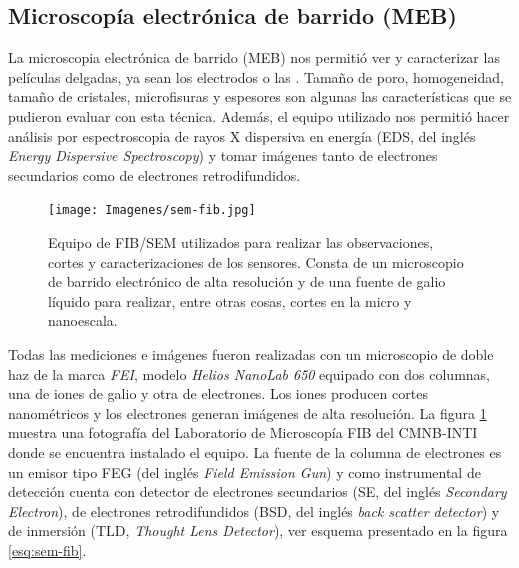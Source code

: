 	\subsection{Microscopía electrónica de barrido (MEB)}\label{sec:SEM}

		La microscopia electrónica de barrido (MEB) nos permitió ver y caracterizar las películas delgadas, ya sean los electrodos o las \pdm. Tamaño de poro, homogeneidad, tamaño de cristales, microfisuras y espesores son algunas las características que se pudieron evaluar con esta técnica. Además, el equipo utilizado nos permitió hacer análisis por espectroscopia de rayos X dispersiva en energía (EDS, del inglés \textit{Energy Dispersive Spectroscopy}) y tomar imágenes tanto de electrones secundarios como de electrones retrodifundidos. \cite{Goodhew2000,Watt1997}


			\begin{figure}[t!]
			 		  \begin{center}
			 		  \texttt{[image: Imagenes/sem-fib.jpg]}
			 		  \caption[Microscopio de doble haz FIB/SEM]{Equipo de FIB/SEM utilizados para realizar las observaciones, cortes y caracterizaciones de los sensores. Consta de un microscopio de barrido electrónico de alta resolución y de una fuente de galio líquido para realizar, entre otras cosas, cortes en la micro y nanoescala.}
			 		  \label{fig:sem-fib}
			 		  \end{center}
			 		  \end{figure}


		Todas las mediciones e imágenes fueron realizadas con un microscopio de doble haz de la marca \textit{FEI}, modelo \textit{Helios NanoLab 650} equipado con dos columnas, una de iones de galio y otra de electrones. Los iones producen cortes nanométricos y los electrones generan imágenes de alta resolución. La figura \ref{fig:sem-fib} muestra una fotografía del Laboratorio de Microscopía FIB del CMNB-INTI donde se encuentra instalado el equipo. La fuente de la columna de electrones es un emisor tipo FEG (del inglés \textit{Field Emission Gun}) y como instrumental de detección cuenta con detector de electrones secundarios (SE, del inglés \textit{Secondary Electron}), de electrones retrodifundidos (BSD, del inglés \textit{back scatter detector}) y de inmersión (TLD, \textit{Thought Lens Detector}), ver esquema presentado en la figura \ref{esq:sem-fib}. 

